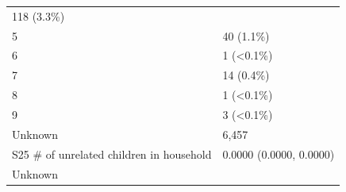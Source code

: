 \documentclass[]{article}
\begin{document}
\begin{longtable}[]{@{}ll@{}}
\begin{minipage}[t]{0.23\columnwidth}
118 (3.3\%)\strut
\end{minipage}\tabularnewline
\begin{minipage}[t]{0.71\columnwidth}\raggedright
5\strut
\end{minipage} & \begin{minipage}[t]{0.23\columnwidth}\raggedright
40 (1.1\%)\strut
\end{minipage}\tabularnewline
\begin{minipage}[t]{0.71\columnwidth}\raggedright
6\strut
\end{minipage} & \begin{minipage}[t]{0.23\columnwidth}\raggedright
1 (\textless{}0.1\%)\strut
\end{minipage}\tabularnewline
\begin{minipage}[t]{0.71\columnwidth}\raggedright
7\strut
\end{minipage} & \begin{minipage}[t]{0.23\columnwidth}\raggedright
14 (0.4\%)\strut
\end{minipage}\tabularnewline
\begin{minipage}[t]{0.71\columnwidth}\raggedright
8\strut
\end{minipage} & \begin{minipage}[t]{0.23\columnwidth}\raggedright
1 (\textless{}0.1\%)\strut
\end{minipage}\tabularnewline
\begin{minipage}[t]{0.71\columnwidth}\raggedright
9\strut
\end{minipage} & \begin{minipage}[t]{0.23\columnwidth}\raggedright
3 (\textless{}0.1\%)\strut
\end{minipage}\tabularnewline
\begin{minipage}[t]{0.71\columnwidth}\raggedright
Unknown\strut
\end{minipage} & \begin{minipage}[t]{0.23\columnwidth}\raggedright
6,457\strut
\end{minipage}\tabularnewline
\begin{minipage}[t]{0.71\columnwidth}\raggedright
S25 \# of unrelated children in household\strut
\end{minipage} & \begin{minipage}[t]{0.23\columnwidth}\raggedright
0.0000 (0.0000, 0.0000)\strut
\end{minipage}\tabularnewline
\begin{minipage}[t]{0.71\columnwidth}\raggedright
Unknown\strut

\end{minipage}
\end{longtable}
\end{document}
